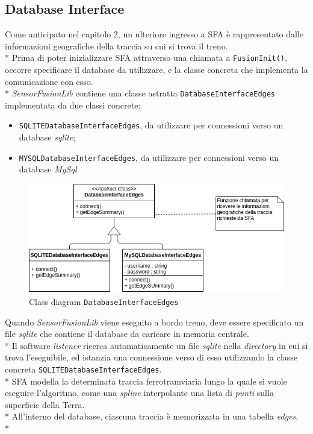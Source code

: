 \subsection{Database Interface}
Come anticipato nel capitolo 2, un ulteriore ingresso a SFA \`e rappresentato dalle informazioni geografiche della traccia su cui si trova il treno.\\*
Prima di poter inizializzare SFA attraverso una chiamata a \texttt{FusionInit()}, occorre specificare il database da utilizzare, e la classe concreta che implementa la comunicazione con esso.\\*
\emph{SensorFusionLib} contiene una classe astratta \texttt{DatabaseInterfaceEdges} implementata da due classi concrete:
\begin{itemize}
	\item \texttt{SQLITEDatabaseInterfaceEdges}, da utilizzare per connessioni verso un database \textit{sqlite};
	\item \texttt{MYSQLDatabaseInterfaceEdges}, da utilizzare per connessioni verso un database \textit{MySql}.
\end{itemize}
\begin{figure}[h]
	\centering
	\includegraphics[width=0.7\linewidth]{img/dbintface}
	\caption{Class diagram \texttt{DatabaseInterfaceEdges}}
	\label{fig:dbiface}
\end{figure}
Quando \emph{SensorFusionLib} viene eseguito a bordo treno, deve essere specificato un file \textit{sqlite} che contiene il database da caricare in memoria centrale.\\*
Il software \emph{listener} ricerca automaticamente un file \textit{sqlite} nella \emph{directory} in cui si trova l'eseguibile, ed istanzia una connessione verso di esso utilizzando la classe concreta \texttt{SQLITEDatabaseInterfaceEdges}.\\*
SFA modella la determinata traccia ferrotramviaria lungo la quale si vuole eseguire l'algoritmo, come una \emph{spline} interpolante una lista di \emph{punti} sulla superficie della Terra.\\*
All'interno del database, ciascuna traccia \`e memorizzata in una tabella \emph{edges}.\\*
